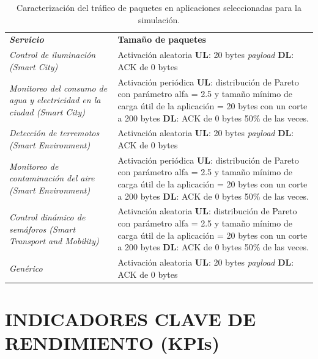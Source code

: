 \begin{table}
\caption{Caracterización del tráfico de paquetes en aplicaciones seleccionadas para la simulación.}
\label{tab:trafpkt}
\centering
\begin{tabular}{*{2}{m{7cm}}}\\ 
\textbf{\textit{Servicio}} & \textbf{Tamaño de paquetes} \\ 
\textit{Control de iluminación (Smart City) } & \footnotesize{ Activación aleatoria \textbf{UL}: 20 bytes \textit{payload} \textbf{DL}: ACK de 0 bytes } \\ \hline 
\textit{Monitoreo del consumo de agua y electricidad en la ciudad (Smart City) } & \footnotesize{ Activación periódica \textbf{UL}: distribución de Pareto con parámetro alfa = 2.5 y tamaño mínimo de carga útil de la aplicación = 20 bytes con un corte a 200 bytes \textbf{DL}: ACK de 0 bytes 50\% de las veces. } \\ \hline 
\textit{Detección de terremotos (Smart Environment)}  & \footnotesize{ Activación aleatoria \textbf{UL}: 20 bytes \textit{payload} \textbf{DL}: ACK de 0 bytes } \\ \hline 
\textit{Monitoreo de contaminación del aire (Smart Environment) } & \footnotesize{ Activación periódica \textbf{UL}: distribución de Pareto con parámetro alfa = 2.5 y tamaño mínimo de carga útil de la aplicación = 20 bytes con un corte a 200 bytes \textbf{DL}: ACK de 0 bytes 50\% de las veces. } \\ \hline 
\textit{Control dinámico de semáforos (Smart Transport and Mobility)}  & \footnotesize{ Activación aleatoria \textbf{UL}: distribución de Pareto con parámetro alfa = 2.5 y tamaño mínimo de carga útil de la aplicación = 20 bytes con un corte a 200 bytes \textbf{DL}: ACK de 0 bytes 50\% de las veces. } \\ \hline 
\textit{Genérico}  & \footnotesize{ Activación aleatoria \textbf{UL}: 20 bytes \textit{payload} \textbf{DL}: ACK de 0 bytes } \\  
\end{tabular}
\end{table}



\section{INDICADORES CLAVE DE RENDIMIENTO (KPIs)}

